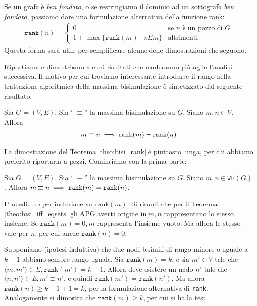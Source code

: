 Se un grafo è \emph{ben fondato}, o se restringiamo il dominio ad un sottografo \emph{ben fondato}, possiamo dare una formulazione alternativa della funzione rank:
\begin{gather*}
        \texttt{rank}(n) = \begin{cases}
            0 &\text{se $n$ è un pozzo di $G$}\\
            1 + \max\{\texttt{rank}(m) \mid n E m\} &\text{altrimenti}
        \end{cases}
\end{gather*}
Questa forma sarà utile per semplificare alcune delle dimostrazioni che seguono.

Riportiamo e dimostriamo alcuni risultati \cite{dovier} che renderanno più agile l'analisi successiva. Il motivo per cui troviamo interessante introdurre il rango nella trattazione algoritmica della massima bisimulazione è sintetizzato dal seguente risultato:
\begin{theorem}
    \label{theo:bisi_rank}
    Sia $G = (V,E)$. Sia ``\,$\equiv$'' la massima bisimulazione su $G$. Siano $m,n \in V$. Allora
    \begin{gather*}
        m \equiv n \implies \textup{rank}(m) = \textup{rank}(n)
    \end{gather*}
\end{theorem}
La dimostrazione del Teorema \ref{theo:bisi_rank} è piuttosto lunga, per cui abbiamo preferito riportarla a pezzi. Cominciamo con la prima parte:
\begin{proposition} \label{prop:rank_bisi_imp_wf}
    Sia $G = (V,E)$. Sia ``\,$\equiv$'' la massima bisimulazione su $G$. Siano $m,n \in \texttt{WF}(G)$. Allora $m \equiv n \implies \verb|rank|(m) = \verb|rank|(n)$.
\end{proposition}
\begin{proof2}
    Procediamo per induzione su $\texttt{rank}(m)$. Si ricordi che per il Teorema \ref{theo:bisi_iff_eqsets} gli APG aventi origine in $m,n$ rappresentano lo stesso insieme. Se $\texttt{rank}(m) = 0, m$ rappresenta l'insieme vuoto. Ma allora lo stesso vale per $n$, per cui anche $\texttt{rank}(n) = 0$.

    Supponiamo (ipotesi induttiva) che due nodi bisimili di rango minore o uguale a $k-1$ abbiano sempre rango uguale. Sia $\texttt{rank}(m) = k$, e sia $m' \in V$ tale che $\langle m, m'\rangle \in E, \texttt{rank}(m') = k-1$. Allora deve esistere un nodo $n'$ tale che $\langle n, n'\rangle \in E, m' \equiv n'$, e quindi $\texttt{rank}(m') = \texttt{rank}(n')$. Ma allora $\texttt{rank}(n) \geq k-1 + 1 = k$, per la formulazione alternativa di \texttt{rank}. Analogamente si dimostra che $\texttt{rank}(m) \geq k$, per cui si ha la tesi.
\end{proof2}

